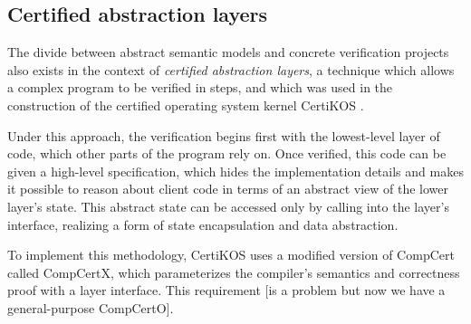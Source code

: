 \documentclass[acmsmall,screen,review,anonymous]{acmart}
\begin{document}
%


\subsection{Certified abstraction layers} %

The divide between abstract semantic models
and concrete verification projects
also exists in the context of \emph{certified abstraction layers},
a technique which
allows a complex program to be verified in steps,
and which was used in the construction of
the certified operating system kernel CertiKOS
\cite{popl15,ccal}.

Under this approach,
the verification begins first with the lowest-level layer of code,
which other parts of the program rely on.
Once verified,
this code can be given a high-level specification,
which hides the implementation details
and makes it possible to reason about client code
in terms of an abstract view
of the lower layer's state.
This abstract state
can be accessed only by calling into
the layer's interface,
realizing a form of state encapsulation
and data abstraction.

To implement this methodology,
CertiKOS uses a modified version of CompCert
called CompCertX,
which parameterizes the compiler's semantics and correctness proof
with a layer interface.
This requirement [is a problem but now we have a general-purpose CompCertO].
\end{document}
